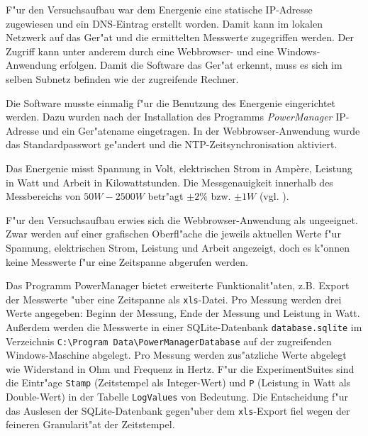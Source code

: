 F"ur den Versuchsaufbau war dem Energenie eine statische IP-Adresse zugewiesen und ein DNS-Eintrag erstellt worden. Damit kann im lokalen Netzwerk auf das Ger"at und die ermittelten Messwerte zugegriffen werden. Der Zugriff kann unter anderem durch eine Webbrowser- und eine Windows-Anwendung erfolgen. Damit die Software das Ger"at erkennt, muss es sich im selben Subnetz befinden wie der zugreifende Rechner. 

Die Software musste einmalig f"ur die Benutzung des Energenie eingerichtet werden. Dazu wurden nach der Installation des Programms \textit{PowerManager} IP-Adresse und ein Ger"atename eingetragen. In der Webbrowser-Anwendung wurde das Standardpasswort ge"andert und die NTP-Zeitsynchronisation aktiviert. 

Das Energenie misst Spannung in Volt, elektrischen Strom in Amp\`{e}re, Leistung in Watt und Arbeit in Kilowattstunden. Die Messgenauigkeit innerhalb des Messbereichs von $50 W - 2500 W$ betr"agt $\pm 2\%$ bzw. $\pm 1 W$ (vgl. \cite{scrguide03}). %

F"ur den Versuchsaufbau erwies sich die Webbrowser-Anwendung als ungeeignet. Zwar werden auf einer grafischen Oberfl"ache die jeweils aktuellen Werte f"ur Spannung, elektrischen Strom, Leistung und Arbeit angezeigt, doch es k"onnen keine Messwerte f"ur eine Zeitspanne abgerufen werden. 

Das Programm PowerManager bietet erweiterte Funktionalit"aten, z.B. Export der Messwerte "uber eine Zeitspanne als \texttt{xls}-Datei. Pro Messung werden drei Werte angegeben: Beginn der Messung, Ende der Messung und Leistung in Watt. Au\ss erdem werden die Messwerte in einer SQLite-Datenbank \texttt{database.sqlite} im Verzeichnis \texttt{C:\textbackslash Program Data\textbackslash PowerManagerData\-base} auf der zugreifenden Windows-Maschine abgelegt. Pro Messung werden zus"atzliche Werte abgelegt wie Widerstand in Ohm und Frequenz in Hertz. F"ur die ExperimentSuites sind die Eintr"age \texttt{Stamp} (Zeitstempel als Integer-Wert) und \texttt{P} (Leistung in Watt als Double-Wert) in der Tabelle \texttt{LogValues} von Bedeutung. Die Entscheidung f"ur das Auslesen der SQLite-Datenbank gegen"uber dem \texttt{xls}-Export fiel wegen der feineren Granularit"at der Zeitstempel. 

